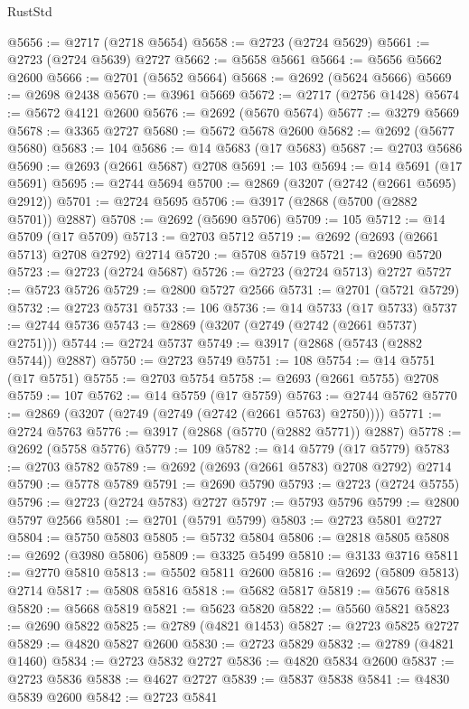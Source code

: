 \begin{lexlean}{RustStd}
\begin{coremodule}
@5656 := @2717 (@2718 @5654)
@5658 := @2723 (@2724 @5629)
@5661 := @2723 (@2724 @5639) @2727
@5662 := @5658 @5661
@5664 := @5656 @5662 @2600
@5666 := @2701 (@5652 @5664)
@5668 := @2692 (@5624 @5666)
@5669 := @2698 @2438
@5670 := @3961 @5669
@5672 := @2717 (@2756 @1428)
@5674 := @5672 @4121 @2600
@5676 := @2692 (@5670 @5674)
@5677 := @3279 @5669
@5678 := @3365 @2727
@5680 := @5672 @5678 @2600
@5682 := @2692 (@5677 @5680)
@5683 := 104
@5686 := @14 @5683 (@17 @5683)
@5687 := @2703 @5686
@5690 := @2693 (@2661 @5687) @2708
@5691 := 103
@5694 := @14 @5691 (@17 @5691)
@5695 := @2744 @5694
@5700 := @2869 (@3207 (@2742 (@2661 @5695) @2912))
@5701 := @2724 @5695
@5706 := @3917 (@2868 (@5700 (@2882 @5701)) @2887)
@5708 := @2692 (@5690 @5706)
@5709 := 105
@5712 := @14 @5709 (@17 @5709)
@5713 := @2703 @5712
@5719 := @2692 (@2693 (@2661 @5713) @2708 @2792) @2714
@5720 := @5708 @5719
@5721 := @2690 @5720
@5723 := @2723 (@2724 @5687)
@5726 := @2723 (@2724 @5713) @2727
@5727 := @5723 @5726
@5729 := @2800 @5727 @2566
@5731 := @2701 (@5721 @5729)
@5732 := @2723 @5731
@5733 := 106
@5736 := @14 @5733 (@17 @5733)
@5737 := @2744 @5736
@5743 := @2869 (@3207 (@2749 (@2742 (@2661 @5737) @2751)))
@5744 := @2724 @5737
@5749 := @3917 (@2868 (@5743 (@2882 @5744)) @2887)
@5750 := @2723 @5749
@5751 := 108
@5754 := @14 @5751 (@17 @5751)
@5755 := @2703 @5754
@5758 := @2693 (@2661 @5755) @2708
@5759 := 107
@5762 := @14 @5759 (@17 @5759)
@5763 := @2744 @5762
@5770 := @2869 (@3207 (@2749 (@2749 (@2742 (@2661 @5763) @2750))))
@5771 := @2724 @5763
@5776 := @3917 (@2868 (@5770 (@2882 @5771)) @2887)
@5778 := @2692 (@5758 @5776)
@5779 := 109
@5782 := @14 @5779 (@17 @5779)
@5783 := @2703 @5782
@5789 := @2692 (@2693 (@2661 @5783) @2708 @2792) @2714
@5790 := @5778 @5789
@5791 := @2690 @5790
@5793 := @2723 (@2724 @5755)
@5796 := @2723 (@2724 @5783) @2727
@5797 := @5793 @5796
@5799 := @2800 @5797 @2566
@5801 := @2701 (@5791 @5799)
@5803 := @2723 @5801 @2727
@5804 := @5750 @5803
@5805 := @5732 @5804
@5806 := @2818 @5805
@5808 := @2692 (@3980 @5806)
@5809 := @3325 @5499
@5810 := @3133 @3716
@5811 := @2770 @5810
@5813 := @5502 @5811 @2600
@5816 := @2692 (@5809 @5813) @2714
@5817 := @5808 @5816
@5818 := @5682 @5817
@5819 := @5676 @5818
@5820 := @5668 @5819
@5821 := @5623 @5820
@5822 := @5560 @5821
@5823 := @2690 @5822
@5825 := @2789 (@4821 @1453)
@5827 := @2723 @5825 @2727
@5829 := @4820 @5827 @2600
@5830 := @2723 @5829
@5832 := @2789 (@4821 @1460)
@5834 := @2723 @5832 @2727
@5836 := @4820 @5834 @2600
@5837 := @2723 @5836
@5838 := @4627 @2727
@5839 := @5837 @5838
@5841 := @4830 @5839 @2600
@5842 := @2723 @5841

\end{coremodule}
\end{lexlean}
